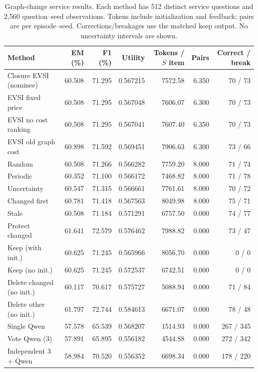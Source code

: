 \begin{table}[t]
\centering\small
\begin{tabular}{lrrrrrr}
\toprule
Method & EM (\%) & F1 (\%) & Utility & Tokens / $S$ item & Pairs & Correct / break \\
\midrule
Closure EVSI (nominee) & 60.508 & 71.295 & 0.567215 & 7572.58 & 6.350 & 70 / 73 \\
EVSI fixed price & 60.508 & 71.295 & 0.567048 & 7606.07 & 6.300 & 70 / 73 \\
EVSI no cost ranking & 60.508 & 71.295 & 0.567041 & 7607.40 & 6.350 & 70 / 73 \\
EVSI old graph cost & 60.898 & 71.592 & 0.569451 & 7906.63 & 6.300 & 73 / 66 \\
Random & 60.508 & 71.266 & 0.566282 & 7759.20 & 8.000 & 71 / 74 \\
Periodic & 60.352 & 71.100 & 0.566172 & 7468.82 & 8.000 & 71 / 78 \\
Uncertainty & 60.547 & 71.315 & 0.566661 & 7761.61 & 8.000 & 70 / 72 \\
Changed first & 60.781 & 71.418 & 0.567563 & 8049.98 & 8.000 & 75 / 71 \\
Stale & 60.508 & 71.184 & 0.571291 & 6757.50 & 0.000 & 74 / 77 \\
Protect changed & 61.641 & 72.579 & 0.576462 & 7988.82 & 0.000 & 73 / 47 \\
Keep (with init.) & 60.625 & 71.245 & 0.565966 & 8056.70 & 0.000 & 0 / 0 \\
Keep (no init.) & 60.625 & 71.245 & 0.572537 & 6742.51 & 0.000 & 0 / 0 \\
Delete changed (no init.) & 60.117 & 70.617 & 0.575727 & 5088.94 & 0.000 & 71 / 84 \\
Delete other (no init.) & 61.797 & 72.744 & 0.584613 & 6671.07 & 0.000 & 78 / 48 \\
Single Qwen & 57.578 & 65.539 & 0.568207 & 1514.93 & 0.000 & 267 / 345 \\
Vote Qwen (3) & 57.891 & 65.895 & 0.556182 & 4544.88 & 0.000 & 272 / 342 \\
Independent 3 + Qwen & 58.984 & 70.520 & 0.556352 & 6698.34 & 0.000 & 178 / 220 \\
\bottomrule
\end{tabular}
\caption{Graph-change service results. Each method has 512 distinct service questions and 2,560 question--seed observations. Tokens include initialization and feedback; pairs are per episode--seed. Corrections/breakages use the matched keep output. No uncertainty intervals are shown.}
\label{tab:change}
\end{table}
